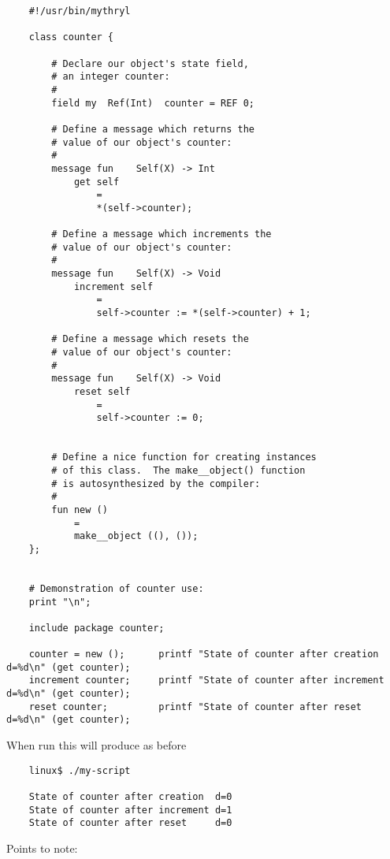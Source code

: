 \begin{verbatim}
    #!/usr/bin/mythryl

    class counter {

        # Declare our object's state field,
        # an integer counter:
        # 
        field my  Ref(Int)  counter = REF 0;

        # Define a message which returns the
        # value of our object's counter:
        #
        message fun    Self(X) -> Int
            get self
                =
                *(self->counter);

        # Define a message which increments the
        # value of our object's counter:
        #
        message fun    Self(X) -> Void
            increment self
                =
                self->counter := *(self->counter) + 1;

        # Define a message which resets the
        # value of our object's counter:
        #
        message fun    Self(X) -> Void
            reset self
                =
                self->counter := 0;


        # Define a nice function for creating instances
        # of this class.  The make__object() function
        # is autosynthesized by the compiler:
        #
        fun new ()
            =
            make__object ((), ());
    };


    # Demonstration of counter use:
    print "\n";

    include package counter;

    counter = new ();      printf "State of counter after creation  d=%d\n" (get counter);
    increment counter;     printf "State of counter after increment d=%d\n" (get counter);
    reset counter;         printf "State of counter after reset     d=%d\n" (get counter);
\end{verbatim}

When run this will produce as before

\begin{verbatim}
    linux$ ./my-script

    State of counter after creation  d=0
    State of counter after increment d=1
    State of counter after reset     d=0
\end{verbatim}

Points to note:

